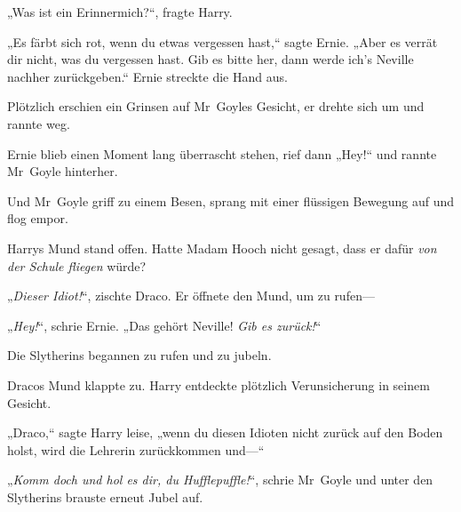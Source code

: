 „Was ist ein Erinnermich?“, fragte Harry.

„Es färbt sich rot, wenn du etwas vergessen hast,“ sagte Ernie. „Aber es verrät dir nicht, was du vergessen hast. Gib es bitte her, dann werde ich’s Neville nachher zurückgeben.“ Ernie streckte die Hand aus.

Plötzlich erschien ein Grinsen auf Mr~Goyles Gesicht, er drehte sich um und rannte weg.

Ernie blieb einen Moment lang überrascht stehen, rief dann „Hey!“ und rannte Mr~Goyle hinterher.

Und Mr~Goyle griff zu einem Besen, sprang mit einer flüssigen Bewegung auf und flog empor.

Harrys Mund stand offen. Hatte Madam Hooch nicht gesagt, dass er dafür \emph{von der Schule fliegen} würde?

„\emph{Dieser Idiot!}“, zischte Draco. Er öffnete den Mund, um zu rufen—

„\emph{Hey!}“, schrie Ernie. „Das gehört Neville! \emph{Gib es zurück!}“

Die Slytherins begannen zu rufen und zu jubeln.

Dracos Mund klappte zu. Harry entdeckte plötzlich Verunsicherung in seinem Gesicht.

„Draco,“ sagte Harry leise, „wenn du diesen Idioten nicht zurück auf den Boden holst, wird die Lehrerin zurückkommen und—“

„\emph{Komm doch und hol es dir, du Hufflepuffle!}“, schrie Mr~Goyle und unter den Slytherins brauste erneut Jubel auf.

